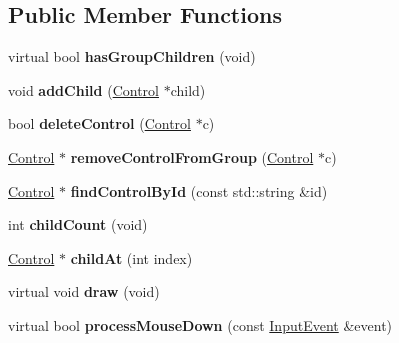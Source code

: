 \subsection*{Public Member Functions}
\begin{DoxyCompactItemize}
\item 
virtual bool {\bfseries has\+Group\+Children} (void)\hypertarget{classGroupControl_a992a7003a77415c77df353a72456a932}{}\label{classGroupControl_a992a7003a77415c77df353a72456a932}

\item 
void {\bfseries add\+Child} (\hyperlink{classControl}{Control} $\ast$child)\hypertarget{classGroupControl_a71ec2f983610426a14264846903c2efa}{}\label{classGroupControl_a71ec2f983610426a14264846903c2efa}

\item 
bool {\bfseries delete\+Control} (\hyperlink{classControl}{Control} $\ast$c)\hypertarget{classGroupControl_a073d64f52a68a09c71004fc110312f0c}{}\label{classGroupControl_a073d64f52a68a09c71004fc110312f0c}

\item 
\hyperlink{classControl}{Control} $\ast$ {\bfseries remove\+Control\+From\+Group} (\hyperlink{classControl}{Control} $\ast$c)\hypertarget{classGroupControl_afee2ea055689509c26aac63506d83736}{}\label{classGroupControl_afee2ea055689509c26aac63506d83736}

\item 
\hyperlink{classControl}{Control} $\ast$ {\bfseries find\+Control\+By\+Id} (const std\+::string \&id)\hypertarget{classGroupControl_a8b7a8d85ab32b63c30ddd4a8f5371b17}{}\label{classGroupControl_a8b7a8d85ab32b63c30ddd4a8f5371b17}

\item 
int {\bfseries child\+Count} (void)\hypertarget{classGroupControl_a6f29b0d7204befd35a9947b76fcf1d24}{}\label{classGroupControl_a6f29b0d7204befd35a9947b76fcf1d24}

\item 
\hyperlink{classControl}{Control} $\ast$ {\bfseries child\+At} (int index)\hypertarget{classGroupControl_af3bef28b01cea2c4399800e82018d445}{}\label{classGroupControl_af3bef28b01cea2c4399800e82018d445}

\item 
virtual void {\bfseries draw} (void)\hypertarget{classGroupControl_a6a0b4844c1f142140b544fdf9cca8982}{}\label{classGroupControl_a6a0b4844c1f142140b544fdf9cca8982}

\item 
virtual bool {\bfseries process\+Mouse\+Down} (const \hyperlink{structInputEvent}{Input\+Event} \&event)\hypertarget{classGroupControl_a26d6d720b55005fa2eed82dacbeaddc4}{}\label{classGroupControl_a26d6d720b55005fa2eed82dacbeaddc4}


\end{DoxyCompactItemize}
